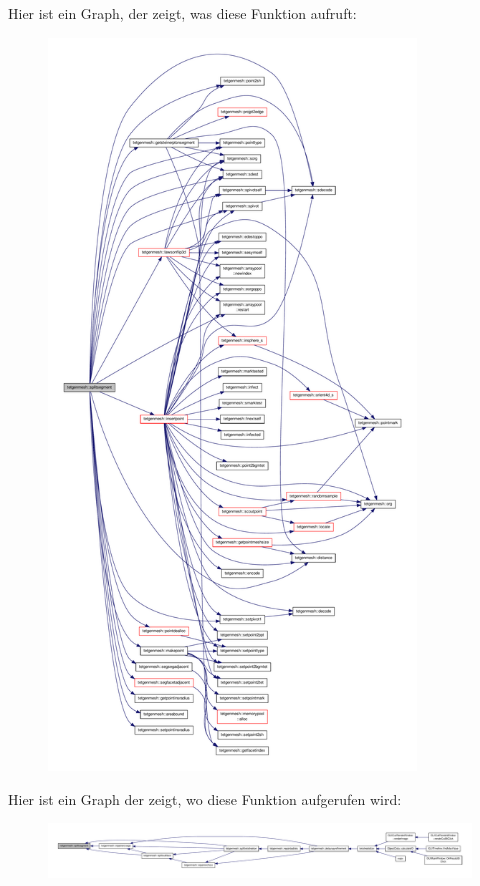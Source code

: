 Hier ist ein Graph, der zeigt, was diese Funktion aufruft\-:\nopagebreak
\begin{figure}[H]
\begin{center}
\leavevmode
\includegraphics[height=550pt]{classtetgenmesh_a6394d7b4d386e8d08077c39cd8983e0e_cgraph}
\end{center}
\end{figure}




Hier ist ein Graph der zeigt, wo diese Funktion aufgerufen wird\-:\nopagebreak
\begin{figure}[H]
\begin{center}
\leavevmode
\includegraphics[width=350pt]{classtetgenmesh_a6394d7b4d386e8d08077c39cd8983e0e_icgraph}
\end{center}
\end{figure}



